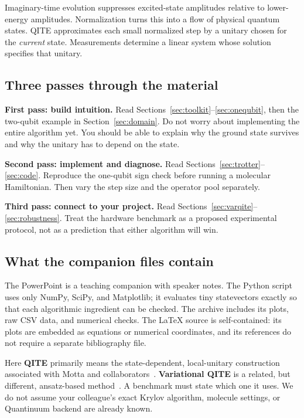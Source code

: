 \documentclass[11pt,a4paper]{article}
\begin{document}
\begin{idea}
Imaginary-time evolution suppresses excited-state amplitudes relative to lower-energy amplitudes. Normalization turns this into a flow of physical quantum states. QITE approximates each small normalized step by a unitary chosen for the \emph{current} state. Measurements determine a linear system whose solution specifies that unitary.
\end{idea}

\subsection*{Three passes through the material}
\textbf{First pass: build intuition.} Read Sections~\ref{sec:toolkit}--\ref{sec:onequbit}, then the two-qubit example in Section~\ref{sec:domain}. Do not worry about implementing the entire algorithm yet. You should be able to explain why the ground state survives and why the unitary has to depend on the state.

\textbf{Second pass: implement and diagnose.} Read Sections~\ref{sec:trotter}--\ref{sec:code}. Reproduce the one-qubit sign check before running a molecular Hamiltonian. Then vary the step size and the operator pool separately.

\textbf{Third pass: connect to your project.} Read Sections~\ref{sec:varqite}--\ref{sec:robustness}. Treat the hardware benchmark as a proposed experimental protocol, not as a prediction that either algorithm will win.

\subsection*{What the companion files contain}
The PowerPoint is a teaching companion with speaker notes. The Python script uses only NumPy, SciPy, and Matplotlib; it evaluates tiny statevectors exactly so that each algorithmic ingredient can be checked. The archive includes its plots, raw CSV data, and numerical checks. The \LaTeX{} source is self-contained: its plots are embedded as equations or numerical coordinates, and its references do not require a separate bibliography file.

\begin{caution}[Scope]
Here \textbf{QITE} primarily means the state-dependent, local-unitary construction associated with Motta and collaborators~\cite{motta}. \textbf{Variational QITE} is a related, but different, ansatz-based method~\cite{mcardle,yuan}. A benchmark must state which one it uses. We do not assume your colleague's exact Krylov algorithm, molecule settings, or Quantinuum backend are already known.
\end{caution}
\end{document}
